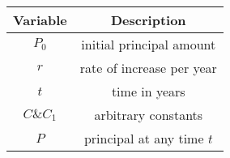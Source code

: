 \begin{tabular}{|c|c|}
    \hline
    \textbf{Variable} & \textbf{Description}\\
    \hline
    $P_0$ & initial principal amount\\
    \hline
    $r$ & rate of increase per year\\
    \hline
    $t$ & time in years\\
    \hline 
    $C \& C_1$ & arbitrary constants\\
    \hline
    $P$ & principal at any time $t$\\
    \hline
\end{tabular}
